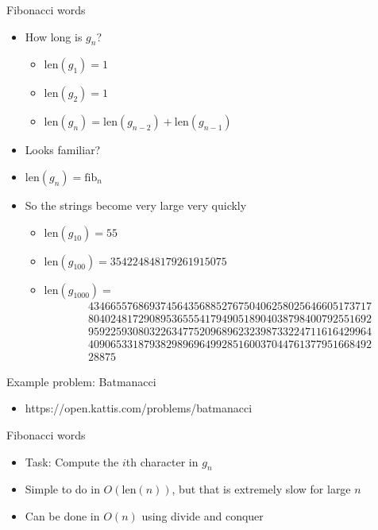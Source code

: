 \documentclass[10pt]{beamer}
\newcommand{\bi}{\begin{itemize}}
\newcommand{\ei}{\end{itemize}}
\begin{document}
\begin{frame}{Fibonacci words}
    \bi
        \item How long is $g_n$?
            \bi
                \item $\mathrm{len}(g_1) = 1$
                \item $\mathrm{len}(g_2) = 1$
                \item $\mathrm{len}(g_n) = \mathrm{len}(g_{n-2}) + \mathrm{len}(g_{n-1})$
            \ei
        \vspace{5pt}
        \item Looks familiar?
        \vspace{2pt}
        \item $\mathrm{len}(g_n) = \mathrm{fib}_{n}$
        \vspace{10pt}
        \item So the strings become very large very quickly
            \bi
                \item $\mathrm{len}(g_{10}) = 55$
                \item $\mathrm{len}(g_{100}) = 354224848179261915075$
                \item $\mathrm{len}(g_{1000}) = $ \begin{align*}
                        &434665576869374564356885276750406258025646605173717\\
                        &804024817290895365554179490518904038798400792551692\\
                        &959225930803226347752096896232398733224711616429964\\
                        &409065331879382989696499285160037044761377951668492\\
                        &28875
                    \end{align*}

            \ei
    \ei
\end{frame}

\begin{frame}{Example problem: Batmanacci}
    \bi
        \item https://open.kattis.com/problems/batmanacci
    \ei
\end{frame}

\begin{frame}{Fibonacci words}
    \bi
        \item Task: Compute the $i$th character in $g_{n}$
        \vspace{10pt}
        \item<2-> Simple to do in $O(\mathrm{len}(n))$, but that is extremely slow for large $n$
        \vspace{10pt}
        \item<3-> Can be done in $O(n)$ using divide and conquer
    \ei
\end{frame}
\end{document}
